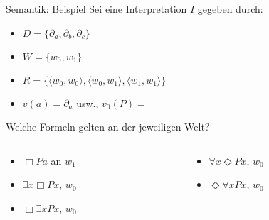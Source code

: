 \documentclass[12pt]{beamer}
\begin{document}
\begin{frame}{Semantik: Beispiel}
  Sei eine Interpretation $I$ gegeben durch: \pause
  \begin{itemize}[<+->]
  \item $D = \{\partial_a, \partial_b, \partial_c\}$
  \item $W = \{w_0, w_1\}$
  \item
    $R = \{\langle w_0, w_0\rangle ,\langle w_0, w_1 \rangle , \langle
    w_1, w_1 \rangle \}$
  \item $v(a) = \partial_a$ usw., $v_{0}(P) = $
  \end{itemize}
  \pause Welche Formeln gelten an der jeweiligen Welt?
  \begin{columns}
    \begin{column}[t]{.5\linewidth}

      \begin{itemize}[<+->]
      \item $\Box Pa$ an $w_1$
      \item $\exists x \Box Px$, $w_0$
      \item $\Box \exists x Px$, $w_0$
      \end{itemize}

    \end{column}

    \begin{column}[t]{.5\linewidth}
      \begin{itemize}[<+->]
      \item $\forall x \Diamond Px$, $w_0$
      \item $\Diamond \forall x Px$, $w_0$
      \end{itemize}
    \end{column}
  \end{columns}

\end{frame}
\end{document}
